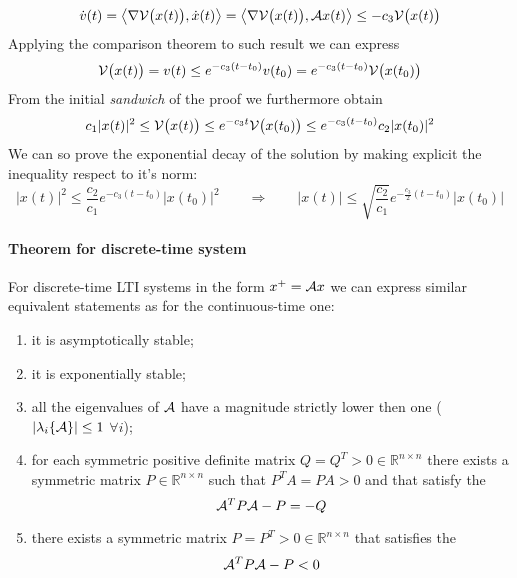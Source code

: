 		\[ \dot v(t) = \big\langle \nabla \mathcal V\big(x(t)\big), \dot x(t) \big\rangle = \big\langle \nabla \mathcal V\big(x(t)\big), \mathcal{A} x(t) \big\rangle \leq - c_3 \mathcal V\big(x(t)\big)  \]
		Applying the comparison theorem to such result we can express
		\[ \mathcal V\big(x(t)\big) = v(t)\leq e^{-c_3(t-t_0)} v(t_0) = e^{-c_3(t-t_0)} \mathcal V \big(x(t_0)\big) \]
		From the initial \textit{sandwich} of the proof we furthermore obtain
		\[ c_1 |x(t)|^2 \leq \mathcal V\big(x(t)\big) \leq e^{-c_3 t} \mathcal V\big(x(t_0)\big) \leq e^{-c_3( t- t_0)} c_2 |x(t_0)|^2 \]
		We can so prove the exponential decay of the solution by making explicit the inequality respect to it's norm:
		\[ |x(t)|^2 \leq \frac{c_2}{c_1} e^{-c_3(t-t_0)} |x(t_0)|^2 \qquad \Rightarrow \qquad |x(t)| \leq \sqrt{\frac{c_2}{c_1}} e^{-\frac {c_3}2 (t-t_0)} |x(t_0)| \]
		
		\paragraph{Theorem for discrete-time system} For discrete-time LTI systems in the form $x^+ = \mathcal{A} x$ we can express similar equivalent statements as for the continuous-time one:
		\begin{enumerate}[\itshape (i)]
			\item it is asymptotically stable;
			\item it is exponentially stable;
			\item all the eigenvalues of $\mathcal{A}$ have a magnitude strictly lower then one ($|\lambda_i\{\mathcal{A}\}|\leq 1$ $\forall i$);
			\item for each symmetric positive definite matrix $Q=Q^T>0 \in \mathds R^{n\times n}$ there exists a symmetric matrix $P\in \mathds R^{n\times n}$ such that $P^T A = PA > 0$ and that satisfy the 
			\[\mathcal{A}^T P \mathcal{A} - P = -Q\]
			\item there exists a symmetric matrix $P = P^T > 0 \in \mathds R^{n\times n}$ that satisfies the 
			\[ \mathcal{A}^T P \mathcal{A} - P < 0 \]
			
		\end{enumerate}
	

